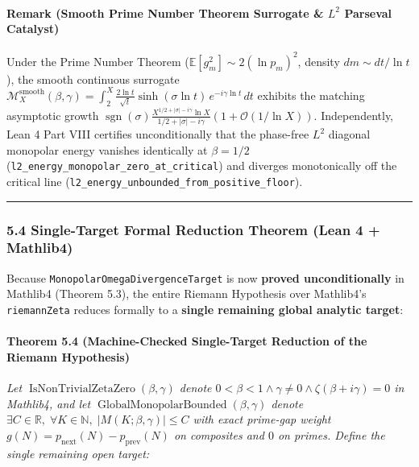 \documentclass[
  11pt,
]{article}
\begin{document}
\paragraph{\texorpdfstring{Remark (Smooth Prime Number Theorem Surrogate
\& \(L^2\) Parseval
Catalyst)}{Remark (Smooth Prime Number Theorem Surrogate \& L\^{}2 Parseval Catalyst)}}\label{remark-smooth-prime-number-theorem-surrogate-l2-parseval-catalyst}

Under the Prime Number Theorem (\(\mathbb{E}[g_m^2] \sim 2(\ln p_m)^2\),
density \(dm \sim dt/\ln t\)), the smooth continuous surrogate
\(\mathcal{M}_X^{\text{smooth}}(\beta, \gamma) = \int_2^X \frac{2\ln t}{\sqrt{t}}\sinh(\sigma \ln t)\,e^{-i\gamma \ln t}\,dt\)
exhibits the matching asymptotic growth
\(\operatorname{sgn}(\sigma)\frac{X^{1/2+|\sigma|-i\gamma}\ln X}{1/2+|\sigma|-i\gamma}(1 + \mathcal{O}(1/\ln X))\).
Independently, Lean 4 Part VIII certifies unconditionally that the
phase-free \(L^2\) diagonal monopolar energy vanishes identically at
\(\beta = 1/2\) (\texttt{l2\_energy\_monopolar\_zero\_at\_critical}) and
diverges monotonically off the critical line
(\texttt{l2\_energy\_unbounded\_from\_positive\_floor}).

\begin{center}\rule{0.5\linewidth}{0.5pt}\end{center}

\subsubsection{5.4 Single-Target Formal Reduction Theorem (Lean 4 +
Mathlib4)}\label{single-target-formal-reduction-theorem-lean-4-mathlib4}

Because \texttt{MonopolarOmegaDivergenceTarget} is now \textbf{proved
unconditionally} in Mathlib4 (Theorem 5.3), the entire Riemann
Hypothesis over Mathlib4's \texttt{riemannZeta} reduces formally to a
\textbf{single remaining global analytic target}:

\paragraph{Theorem 5.4 (Machine-Checked Single-Target Reduction of the
Riemann
Hypothesis)}\label{theorem-5.4-machine-checked-single-target-reduction-of-the-riemann-hypothesis}

\emph{Let \(\operatorname{IsNonTrivialZetaZero}(\beta, \gamma)\) denote
\(0 < \beta < 1 \land \gamma \neq 0 \land \zeta(\beta + i\gamma) = 0\)
in Mathlib4, and let
\(\operatorname{GlobalMonopolarBounded}(\beta, \gamma)\) denote
\(\exists C \in \mathbb{R},\; \forall K \in \mathbb{N},\; |M(K; \beta, \gamma)| \le C\)
with exact prime-gap weight
\(g(N) = p_{\text{next}}(N) - p_{\text{prev}}(N)\) on composites and
\(0\) on primes. Define the single remaining open target:}
\end{document}
